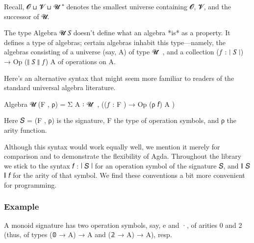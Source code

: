 \documentclass[sigplan,screen]{acmart}
\begin{document}
Recall, 𝓞 ⊔ 𝓥 ⊔  𝓤 ⁺ denotes the smallest universe containing 𝓞, 𝓥, and the successor of 𝓤.

The type Algebra 𝓤 𝑆 doesn't define what an algebra *is* as a property. It defines a type of algebras; certain algebras inhabit this type---namely, the algebras consisting of a universe (say, A) of type 𝓤 ̇ , and a collection (𝑓 : ∣ 𝑆 ∣) → Op (∥ 𝑆 ∥ 𝑓) A of operations on A.

Here's an alternative syntax that might seem more familiar to readers of the standard universal algebra literature.

  Algebra 𝓤 (F , ρ) = Σ A ꞉ 𝓤 ̇ ,  ((𝑓 : F )  → Op (ρ 𝑓) A )

Here 𝑆 = (F , ρ) is the signature, F the type of operation symbols, and ρ the arity function.

Although this syntax would work equally well, we mention it merely for comparison and to demonstrate the flexibility of Agda. Throughout the library we stick to the syntax 𝑓 : ∣ 𝑆 ∣ for an operation symbol of the signature 𝑆, and ∥ 𝑆 ∥ 𝑓 for the arity of that symbol. We find these conventions a bit more convenient for programming.

\subsubsection{Example}
A monoid signature has two operation symbols, say, e  and ·, of arities 0 and 2 (thus, of types (𝟘 → A) → A and (𝟚 → A) → A), resp.

\begin{code}%
\>[0]\AgdaSpace{}%
\AgdaSpace{}%
\AgdaSymbol{:}\AgdaSpace{}%
\AgdaSpace{}%
\AgdaSpace{}%
\<%
\\
\>[0][@{}l@{\AgdaIndent{0}}]%
\>[1]\AgdaSpace{}%
\AgdaSymbol{:}\AgdaSpace{}%
\<%
\\
%
\>[1]\AgdaSpace{}%
\AgdaSymbol{:}\AgdaSpace{}%
\<%
\\
%
\\[\AgdaEmptyExtraSkip]%
\>[0]\AgdaSpace{}%
\AgdaSymbol{:}\AgdaSpace{}%
\AgdaSpace{}%
\AgdaSymbol{\AgdaUnderscore{}}\AgdaSpace{}%
\AgdaSymbol{\AgdaUnderscore{}}\<%
\\
\>[0]\AgdaSpace{}%
\AgdaSymbol{=}\AgdaSpace{}%
\AgdaSpace{}%
\AgdaOperator{\AgdaInductiveConstructor{,}}\AgdaSpace{}%
\AgdaSpace{}%
\AgdaSymbol{\{}\AgdaSpace{}%
\AgdaSpace{}%
\AgdaSpace{}%
\AgdaSymbol{;}\AgdaSpace{}%
\AgdaSpace{}%
\AgdaSpace{}%
\AgdaSpace{}%
\AgdaSymbol{\}}\<%
\end{code}
\end{document}
